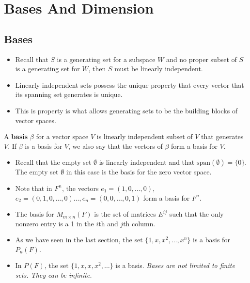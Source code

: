 \section{Bases And Dimension}

\subsection{Bases}

\begin{itemize}
    \item Recall that \( S  \) is a generating set for a subspace \( W  \) and no proper subset of \( S  \) is a generating set for \( W  \), then \( S  \) must be linearly independent. 
    \item Linearly independent sets possess the unique property that every vector that its spanning set generates is unique.
    \item This is property is what allows generating sets to be the building blocks of vector spaces.
\end{itemize}

\begin{definition}[Basis]
    A \textbf{basis} \( \beta \) for a vector space \( V  \) is linearly independent subset of \( V  \) that generates \( V  \). If \( \beta  \) is a basis for \( V  \), we also say that the vectors of \( \beta \) form a basis for \( V  \).
\end{definition}

\begin{eg}
    \begin{itemize}
        \item     Recall that the empty set \( \emptyset \) is linearly independent and that \( \text{span}(\emptyset) = \{ 0 \}  \). The empty set \( \emptyset \) in this case is the basis for the zero vector space.
        \item Note that in \( F^{n}  \), the vectors \( e_{1} = (1,0, \dots, 0 ) \), \( e_{2} = (0,1,0, \dots, 0 ) \dots, e_{n} = (0,0, \dots, 0, 1 ) \) form a basis for \( F^{n} \).
        \item The basis for \( M_{m \times n}(F ) \) is the set of matrices \( E^{ij} \) such that the only nonzero entry is a 1 in the \( i \)th and \( j \)th column.
        \item As we have seen in the last section, the set \( \{ 1, x , x^{2}, \dots, x^{n} \}  \) is a basis for \( P_{n}(F) \).
        \item In \( P(F) \), the set \( \{ 1,x ,x,  x^{2}, \dots \}  \) is a basis. \textit{Bases are not limited to finite sets. They can be infinite.} 
\end{itemize}
\end{eg}

